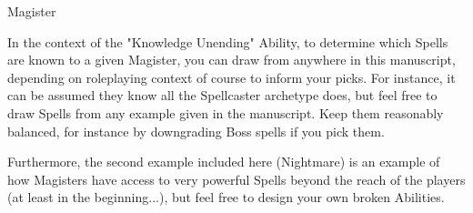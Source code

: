 \begin{monsterboxbg}{Magister}
    

    In the context of the "Knowledge Unending" Ability, to determine which Spells are known to a given Magister, you can draw from anywhere in this manuscript, depending on roleplaying context of course to inform your picks. For instance, it can be assumed they know all the Spellcaster archetype does, but feel free to draw Spells from any example given in the manuscript. Keep them reasonably balanced, for instance by downgrading Boss spells if you pick them.
    
    Furthermore, the second example included here (Nightmare) is an example of how Magisters have access to very powerful Spells beyond the reach of the players (at least in the beginning...), but feel free to design your own broken Abilities.

\end{monsterboxbg}









